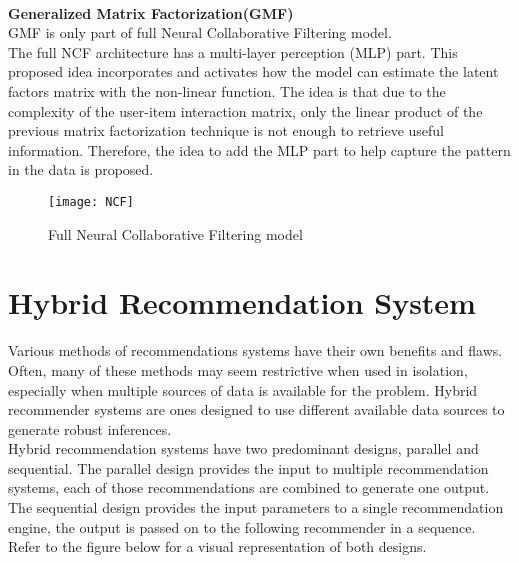 \\\textbf{Generalized Matrix Factorization(GMF)}
 \\GMF is only part of full Neural Collaborative Filtering model.
 \\The full NCF architecture has a multi-layer perception (MLP) part. This proposed idea incorporates and activates how the model can estimate the latent factors matrix with the non-linear function. The idea is that due to the complexity of the user-item interaction matrix, only the linear product of the previous matrix factorization technique is not enough to retrieve useful information. Therefore, the idea to add the MLP part to help capture the pattern in the data is proposed.
 \begin{figure}[ht]
\centering
\texttt{[image: NCF]}
\caption{Full Neural Collaborative Filtering model}
\end{figure}
 

\section{Hybrid Recommendation System}
Various methods of recommendations systems have their own benefits and flaws. Often, many of these methods may seem restrictive when used in isolation, especially when multiple sources of data is available for the problem. Hybrid recommender systems are ones designed to use different available data sources to generate robust inferences.
\\Hybrid recommendation systems have two predominant designs, parallel and sequential. The parallel design provides the input to multiple recommendation systems, each of those recommendations are combined to generate one output. The sequential design provides the input parameters to a single recommendation engine, the output is passed on to the following recommender in a sequence. Refer to the figure below for a visual representation of both designs.

